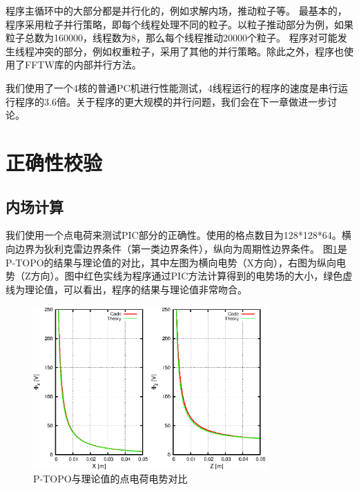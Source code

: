 程序主循环中的大部分都是并行化的，例如求解内场，推动粒子等。
最基本的，程序采用粒子并行策略，即每个线程处理不同的粒子。以粒子推动部分为例，如果粒子总数为160000，线程数为8，那么每个线程推动20000个粒子。
程序对可能发生线程冲突的部分，例如权重粒子，采用了其他的并行策略。除此之外，程序也使用了FFTW库的内部并行方法。



我们使用了一个4核的普通PC机进行性能测试，4线程运行的程序的速度是串行运行程序的3.6倍。关于程序的更大规模的并行问题，我们会在下一章做进一步讨论。
\section{正确性校验}
\subsection{内场计算}
我们使用一个点电荷来测试PIC部分的正确性。使用的格点数目为128*128*64。横向边界为狄利克雷边界条件（第一类边界条件），纵向为周期性边界条件。
图\ref{fig:P_TOPO_verification1}是P-TOPO的结果与理论值的对比，其中左图为横向电势（X方向），右图为纵向电势（Z方向）。图中红色实线为程序通过PIC方法计算得到的电势场的大小，绿色虚线为理论值，可以看出，程序的结果与理论值非常吻合。

\begin{figure}[!htb]
    \centering
    \includegraphics[width=0.8\textwidth]{Img/P_TOPO_verification1.eps}
    \caption{P-TOPO与理论值的点电荷电势对比}
    \label{fig:P_TOPO_verification1}
\end{figure}

